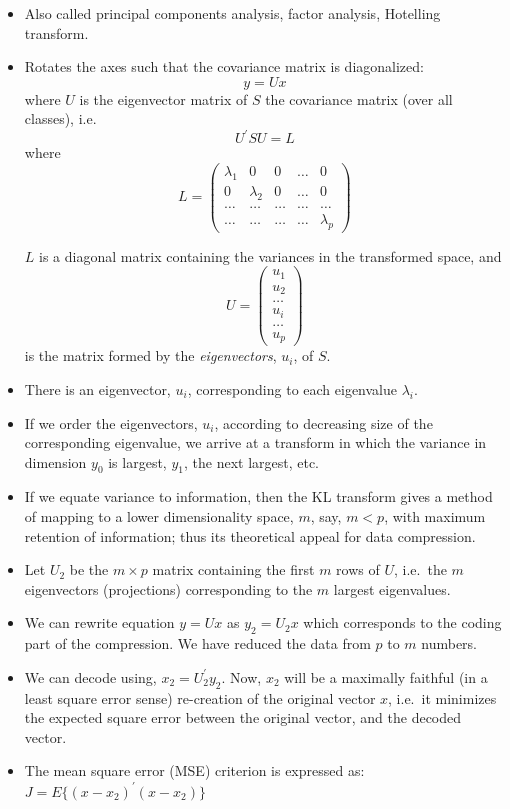 \documentclass[a4,dvips]{seminar}
\newcommand{\heading}[1]{%
  \begin{center}
    \large\bf
    \shadowbox{#1}%
  \end{center}
  \vspace{1ex minus 1ex}}
\begin{document}
\begin{slide}
\textcolor {reddish} {\heading{Karhunen-Lo\`eve Transform}}
\begin{itemize}
\item Also called principal components analysis, factor
analysis, Hotelling transform.
\item Rotates the axes such that the
covariance matrix is diagonalized:
$$     y    = U x  $$
                 where $U$  is the eigenvector matrix
                 of $S$  the covariance matrix (over all classes), i.e.
$$    U^\prime S U = L$$
                 where 
$$
L = \left( 
\begin{array}{ccccc}
\lambda_1  &   0        &   0  & \dots &     0  \\
 0         & \lambda_2  &   0  & \dots &    0  \\
 \dots     &   \dots   &   \dots &  \dots &  \dots \\
 \dots     &   \dots   &    \dots &  \dots & \lambda_p 
\end{array}
\right)
$$
 
                 $L$ is a diagonal matrix containing the variances in
                 the transformed space, and
 $$
U  =  \left(  
\begin{array}{l}
u_1 \\
u_2 \\
\dots \\
u_i \\
\dots \\
u_p 
\end{array}
\right)
$$
is the matrix formed by the {\em eigenvectors}, $u_i$, of $S$.
\item There is an eigenvector, $u_i$, corresponding to each 
eigenvalue $\lambda_i$.
\item If we order the eigenvectors, $u_i$, according to decreasing size of
the corresponding eigenvalue, we arrive at a transform 
in which the variance in dimension $y_0$ is largest, $y_1$, the next
largest, etc. 
\item If we equate variance to information, then the KL transform gives
a method of mapping to a lower dimensionality space, $m$, say, $m < p$,
with maximum retention of information; thus its theoretical appeal
for data compression.  
\item Let $U_2$ be the $m \times p$ matrix containing the
first $m$ rows of $U$, i.e.\ the $m$ eigenvectors (projections)
corresponding to the $m$ largest eigenvalues. 
\item We can rewrite equation 
$y = U x $ as $   y_2   = U_2 x  $
which corresponds to the coding part of the compression.  We have
reduced the data from $p$ to $m$ numbers. 
\item We can decode using,
$    x_2   = U_2^\prime y_2 $.
Now, $x_2$ will be a maximally faithful (in a least square error
sense) re-creation of the original vector $x$, i.e.\ it minimizes the
expected square error between the original vector, and the decoded
vector.
\item The mean square error (MSE) criterion is expressed as:
$     J = E \{ (x - x_2)^\prime (x - x_2) \}  $
\end{itemize}
\end{slide}
\end{document}
